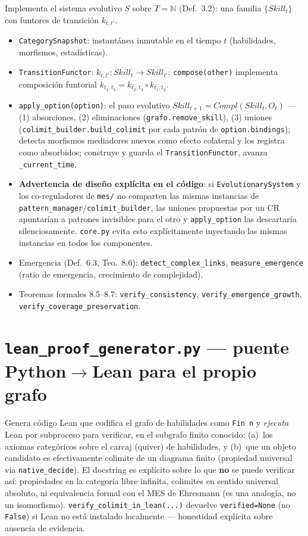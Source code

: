 \documentclass[11pt,a4paper]{report}
\newcommand{\code}[1]{\texttt{#1}}
\begin{document}
Implementa el sistema evolutivo $S$ sobre $T=\mathbb{N}$ (Def.~3.2): una familia $\{Skill_t\}$ con funtores de transici\'on $k_{t,t'}$.

\begin{itemize}
  \item \code{CategorySnapshot}: instant\'anea inmutable en el tiempo $t$ (habilidades, morfismos, estad\'isticas).
  \item \code{TransitionFunctor}: $k_{t,t'}:Skill_t\to Skill_{t'}$; \code{compose(other)} implementa composici\'on funtorial $k_{t_1,t_3}=k_{t_2,t_3}\circ k_{t_1,t_2}$.
  \item \code{apply_option(option)}: el paso evolutivo $Skill_{t+1}=Compl(Skill_t,O_t)$ --- (1) absorciones, (2) eliminaciones (\code{grafo.remove_skill}), (3) uniones (\code{colimit_builder.build_colimit} por cada patr\'on de \code{option.bindings}); detecta morfismos mediadores nuevos como efecto colateral y los registra como absorbidos; construye y guarda el \code{TransitionFunctor}, avanza \code{\_current_time}.
  \item \textbf{Advertencia de dise\~no expl\'icita en el c\'odigo}: si \code{EvolutionarySystem} y los co-reguladores de \code{mes/} no comparten las mismas instancias de \code{pattern_manager}/\code{colimit_builder}, las uniones propuestas por un CR apuntar\'ian a patrones invisibles para el otro y \code{apply_option} las descartar\'ia silenciosamente. \code{core.py} evita esto expl\'icitamente inyectando las mismas instancias en todos los componentes.
  \item Emergencia (Def.~6.3, Teo.~8.6): \code{detect_complex_links}, \code{measure_emergence} (ratio de emergencia, crecimiento de complejidad).
  \item Teoremas formales 8.5--8.7: \code{verify_consistency}, \code{verify_emergence_growth}, \code{verify_coverage_preservation}.
\end{itemize}

\section{\code{lean_proof_generator.py} --- puente Python$\to$Lean para el propio grafo}

Genera c\'odigo Lean que codifica el grafo de habilidades como \code{Fin n} y \emph{ejecuta} Lean por subproceso para verificar, en el subgrafo finito conocido: (a)~los axiomas categ\'oricos sobre el carcaj (quiver) de habilidades, y (b)~que un objeto candidato es efectivamente colimite de un diagrama finito (propiedad universal via \code{native_decide}). El docstring es expl\'icito sobre lo que \textbf{no} se puede verificar as\'i: propiedades en la categor\'ia libre infinita, colimites en sentido universal absoluto, ni equivalencia formal con el MES de Ehresmann (es una analog\'ia, no un isomorfismo). \code{verify_colimit_in_lean(...)} devuelve \code{verified=None} (no \code{False}) si Lean no est\'a instalado localmente --- honestidad expl\'icita sobre ausencia de evidencia.
\end{document}
